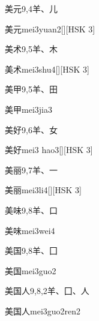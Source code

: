 \begin{entry}{美元}{9,4}{⽺、⼉}
  \begin{phonetics}{美元}{mei3yuan2}[][HSK 3]
  \end{phonetics}
\end{entry}

\begin{entry}{美术}{9,5}{⽺、⽊}
  \begin{phonetics}{美术}{mei3shu4}[][HSK 3]
  \end{phonetics}
\end{entry}

\begin{entry}{美甲}{9,5}{⽺、⽥}
  \begin{phonetics}{美甲}{mei3jia3}
  \end{phonetics}
\end{entry}

\begin{entry}{美好}{9,6}{⽺、⼥}
  \begin{phonetics}{美好}{mei3 hao3}[][HSK 3]
  \end{phonetics}
\end{entry}

\begin{entry}{美丽}{9,7}{⽺、⼀}
  \begin{phonetics}{美丽}{mei3li4}[][HSK 3]
  \end{phonetics}
\end{entry}

\begin{entry}{美味}{9,8}{⽺、⼝}
  \begin{phonetics}{美味}{mei3wei4}
  \end{phonetics}
\end{entry}

\begin{entry}{美国}{9,8}{⽺、⼞}
  \begin{phonetics}{美国}{mei3guo2}
  \end{phonetics}
\end{entry}

\begin{entry}{美国人}{9,8,2}{⽺、⼞、⼈}
  \begin{phonetics}{美国人}{mei3guo2ren2}
  \end{phonetics}
\end{entry}


